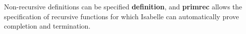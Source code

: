 Non-recursive definitions can be specified \textbf{definition}, and \textbf{primrec} allows the specification of recursive functions for which Isabelle can automatically prove completion and termination. 

